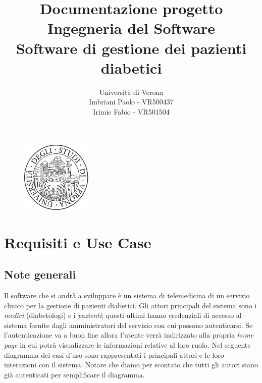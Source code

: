 \documentclass[a4paper]{article}
\begin{document}
\title{Documentazione progetto Ingegneria del Software\\[1ex]
\large Software di gestione dei pazienti diabetici
}

\author{
\vspace{0.8cm}
Università di Verona\\
Imbriani Paolo - VR500437\\
Irimie Fabio - VR501504
}

\begin{figure}
    \centering
    \includegraphics[width=0.3\textwidth]{UniversityofVerona}
\end{figure}

\maketitle 

\pagebreak

\tableofcontents

\pagebreak

\section{Requisiti e Use Case}

\subsection{Note generali}

Il software che si andrà a sviluppare è un sistema di telemedicina di un servizio clinico per la gestione
di pazienti diabetici. Gli attori principali del sistema sono i \textit{medici} (diabetologi) e i \textit{pazienti}; questi ultimi
hanno credenziali di accesso al sistema fornite dagli amministratori del servizio con cui possono autenticarsi.
Se l'autenticazione va a buon fine allora l'utente verrà indirizzato alla propria \textit{home page} in cui potrà
visualizzare le informazioni relative al loro ruolo. Nel seguente diagramma dei casi d'uso sono rappresentati
i principali attori e le loro interazioni con il sistema. Notare che diamo per scontato che tutti gli autori siano già autenticati
per semplificare il diagramma.
\end{document}
